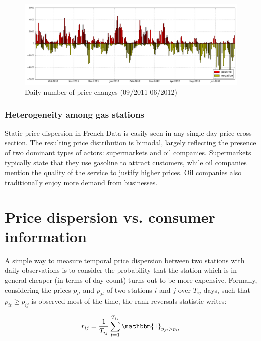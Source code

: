 \documentclass[11pt]{article}
\begin{document}
\begin{figure}[!h]
    \caption{Daily number of price changes (09/2011-06/2012)}
	\centering
		\includegraphics[width=16cm]{graphs/diesel_nb_price_chges.png}
\end{figure}

\subsubsection{Heterogeneity among gas stations}

Static price dispersion in French Data is easily seen in any single day price cross section. The resulting price distribution is bimodal, largely reflecting the presence of two dominant types of actors: supermarkets and oil companies. Supermarkets typically state that they use gasoline to attract customers, while oil companies mention the quality of the service to justify higher prices. Oil companies also traditionally enjoy more demand from businesses.

\section{Price dispersion vs. consumer information}

A simple way to measure temporal price dispersion between two stations with daily observations is to consider the probability that the station which is in general cheaper (in terms of day count) turns out to be more expensive. Formally, considering the prices $p_{it}$ and $p_{jt}$ of two stations $i$ and $j$ over $T_{ij}$ days, such that $p_{it} \ge p_{ij}$ is observed most of the time, the rank reversals statistic writes:

\begin{align*}
r_{ij} = \frac{1}{T_{ij}} \sum_{t=1}^{T_{ij}} \mathbbm{1}_{p_{jt} > p_{it}}
\end{align*}
\end{document}
